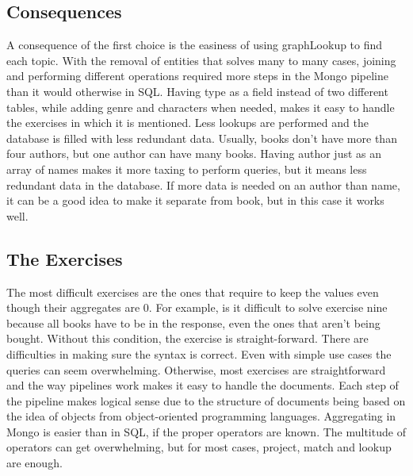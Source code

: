 \documentclass{article}
\begin{document}
	\subsection*{Consequences}
	A consequence of the first choice is the easiness of using graphLookup to find each topic.\newline 
	With the removal of entities that solves many to many cases, joining and performing different operations required more steps in the Mongo pipeline than it would otherwise in SQL. \newline
	Having type as a field instead of two different tables, while adding genre and characters when needed, makes it easy to handle the exercises in which it is mentioned. Less lookups are performed and the database is filled with less redundant data.\newline
	Usually, books don't have more than four authors, but one author can have many books. Having author just as an array of names makes it more taxing to perform queries, but it means less redundant data in the database. If more data is needed on an author than name, it can be a good idea to make it separate from book, but in this case it works well.
	\subsection*{The Exercises}
	The most difficult exercises are the ones that require to keep the values even though their aggregates are 0. For example, is it difficult to solve exercise nine because all books have to be in the response, even the ones that aren't being bought. Without this condition, the exercise is straight-forward. There are difficulties in making sure the syntax is correct. Even with simple use cases the queries can seem overwhelming.\newline
	Otherwise, most exercises are straightforward and the way pipelines work makes it easy to handle the documents. Each step of the pipeline makes logical sense due to the structure of documents being based on the idea of objects from object-oriented programming languages. Aggregating in Mongo is easier than in SQL, if the proper operators are known. The multitude of operators can get overwhelming, but for most cases, project, match and lookup are enough.\newline
\end{document}
